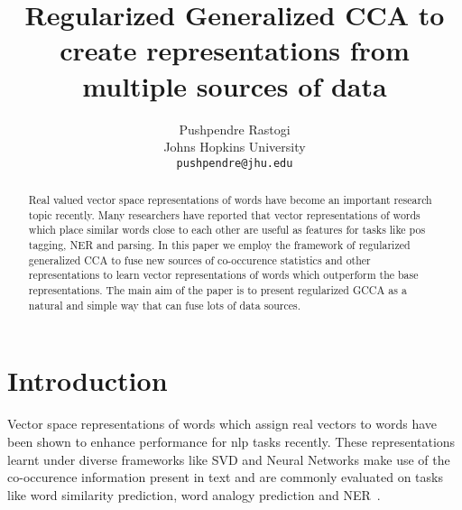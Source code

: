 \documentclass[11pt]{article}
\title{Regularized Generalized CCA to create
  representations from multiple sources of data}
\author{Pushpendre Rastogi \\
  Johns Hopkins University \\
  {\tt pushpendre@jhu.edu} 
}
\date{}
\begin{document}
\maketitle
\begin{abstract}
  Real valued vector space representations of words have become an
  important research topic recently. Many researchers have reported
  that vector representations of words which place similar words close
  to each other are useful as features for tasks like pos tagging, NER and 
  parsing. In this paper we employ the framework of regularized generalized CCA
  to fuse new sources of co-occurence statistics and other representations to learn vector
   representations of words which outperform the base
   representations. The main aim of the paper is to present
   regularized GCCA as a natural and simple way that can fuse lots of
   data sources.
\end{abstract}

\section{Introduction}
Vector space representations of words which assign
 real vectors to words have been shown to enhance performance for nlp
 tasks recently. These representations learnt under diverse frameworks like
 SVD and Neural Networks make use of the co-occurence information
 present in text and are commonly evaluated on tasks
 like word similarity prediction, word analogy prediction and
 NER~\cite{dhillon2011multi,dhillon2012two,mikolov2013efficient,mikolov2013distributed,collobert2013word,zou2013bilingual,faruqui2014improving,pennington2014glove,bansal2014tailoring,levy2014dependency,levy2014linguistic}.
\end{document}
